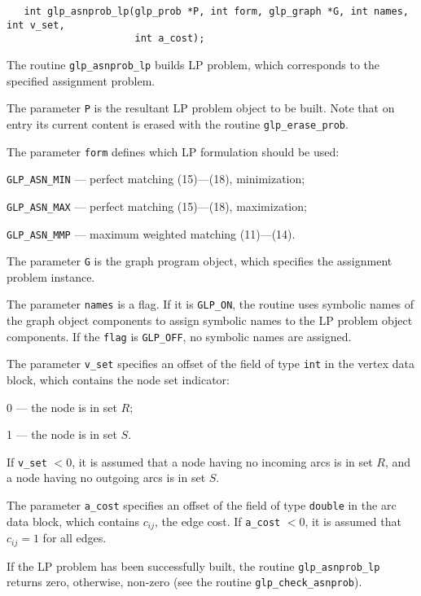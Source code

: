 \documentclass[11pt]{report}
\def\para#1{\noindent{\bf#1}}
\def\synopsis{\para{Synopsis}}
\def\description{\para{Description}}
\def\returns{\para{Returns}}
\begin{document}
\synopsis

\begin{verbatim}
   int glp_asnprob_lp(glp_prob *P, int form, glp_graph *G, int names, int v_set,
                      int a_cost);
\end{verbatim}

\description

The routine \verb|glp_asnprob_lp| builds LP problem, which corresponds
to the specified assignment problem.

\newpage

The parameter \verb|P| is the resultant LP problem object to be built.
Note that on entry its current content is erased with the routine
\verb|glp_erase_prob|.

The parameter \verb|form| defines which LP formulation should be used:

\verb|GLP_ASN_MIN| --- perfect matching (15)---(18), minimization;

\verb|GLP_ASN_MAX| --- perfect matching (15)---(18), maximization;

\verb|GLP_ASN_MMP| --- maximum weighted matching (11)---(14).

The parameter \verb|G| is the graph program object, which specifies the
assignment problem instance.

The parameter \verb|names| is a flag. If it is \verb|GLP_ON|, the
routine uses symbolic names of the graph object components to assign
symbolic names to the LP problem object components. If the \verb|flag|
is \verb|GLP_OFF|, no symbolic names are assigned.

The parameter \verb|v_set| specifies an offset of the field of type
\verb|int| in the vertex data block, which contains the node set
indicator:

0 --- the node is in set $R$;

1 --- the node is in set $S$.

\noindent
If \verb|v_set| $<0$, it is assumed that a node having no incoming arcs
is in set $R$, and a node having no outgoing arcs is in set $S$.

The parameter \verb|a_cost| specifies an offset of the field of type
\verb|double| in the arc data block, which contains $c_{ij}$, the edge
cost. If \verb|a_cost| $<0$, it is assumed that $c_{ij}=1$ for all
edges.

\returns

If the LP problem has been successfully built, the routine
\verb|glp_asnprob_lp| returns zero, otherwise, non-zero (see the
routine \verb|glp_check_asnprob|).
\end{document}
